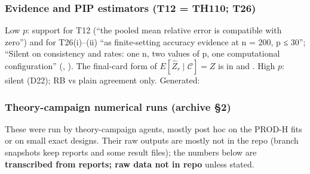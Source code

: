 \subsubsection{Evidence and PIP estimators (T12 = TH110; T26)}
Low $p$: support for T12 (``the pooled mean relative error is compatible with zero'') and for T26(i)--(ii) ``as finite-setting accuracy
evidence at n = 200, p ≤ 30''; ``Silent on consistency and rates: one n, two values of p, one computational configuration''
 (, ). The final-card form of
$E[\hat Z_r\mid\mathcal C]=Z$ is in  and   . High $p$: silent (D22);
RB vs plain agreement only. Generated:


\subsubsection{Theory-campaign numerical runs (archive \S2)}
These were run by theory-campaign agents, mostly post hoc on the PROD-H fits or on small exact designs. Their raw outputs are mostly
not in the repo (branch snapshots keep reports and some result files); the numbers below are \textbf{transcribed from reports; raw data
not in repo} unless stated.

